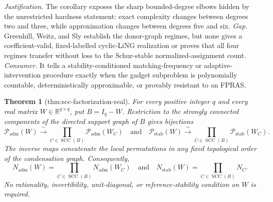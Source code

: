 \documentclass{article}
\newtheorem{theorem}{Theorem}
\begin{document}
\par\smallskip\noindent \textit{Justification.} The corollary exposes the sharp bounded-degree elbows hidden by the unrestricted hardness statement: exact complexity changes between degrees two and three, while approximation changes between degrees five and six. \textit{Gap.} Greenhill, Weitz, and Sly establish the donor-graph regimes, but none gives a coefficient-valid, fixed-labelled cyclic-LiNG realization or proves that all four regimes transfer without loss to the Schur-stable normalized-assignment count. \textit{Consumer.} It tells a stability-conditioned matching-frequency or adaptive-intervention procedure exactly when the gadget subproblem is polynomially countable, deterministically approximable, or provably resistant to an FPRAS.

\begin{theorem}[thm:scc-factorization-real]\label{thm:scc-factorization-real}
For every positive integer \(q\) and every real matrix \(W\in\mathbb R^{q\times q}\), put \(B=I_q-W\). Restriction to the strongly connected components of the directed support graph of \(B\) gives bijections
\[
 \mathcal P_{\mathrm{adm}}(W)
 \xrightarrow{\ \sim\ }
 \prod_{C\in\operatorname{SCC}(B)}
 \mathcal P_{\mathrm{adm}}(W_C)
 \quad\text{and}\quad
 \mathcal P_{\mathrm{stab}}(W)
 \xrightarrow{\ \sim\ }
 \prod_{C\in\operatorname{SCC}(B)}
 \mathcal P_{\mathrm{stab}}(W_C).
\]
The inverse maps concatenate the local permutations in any fixed topological order of the condensation graph. Consequently,
\[
 N_{\mathrm{adm}}(W)
 =\prod_{C\in\operatorname{SCC}(B)}N_{\mathrm{adm}}(W_C)
 \quad\text{and}\quad
 N_{\mathrm{stab}}(W)
 =\prod_{C\in\operatorname{SCC}(B)}N_C.
\]
No rationality, invertibility, unit-diagonal, or reference-stability condition on \(W\) is required.
\end{theorem}
\end{document}
